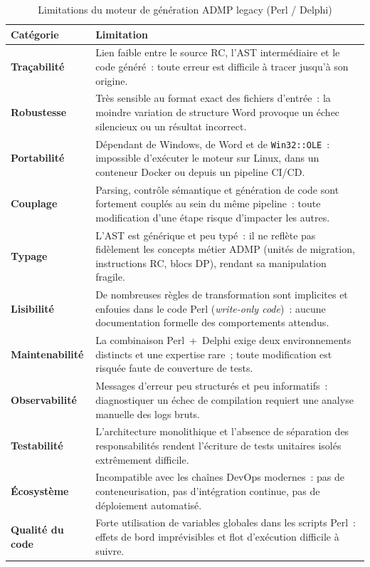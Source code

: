 \begin{table}[H]
\centering
\caption{Limitations du moteur de génération ADMP legacy (Perl / Delphi)}
\label{tab:limits-legacy}
\begin{tabularx}{\textwidth}{lX}
\toprule
\textbf{Catégorie} & \textbf{Limitation} \\
\midrule
\textbf{Traçabilité} &
  Lien faible entre le source RC, l'AST intermédiaire et le code généré~: toute erreur est difficile à tracer jusqu'à son origine. \\
\addlinespace
\textbf{Robustesse} &
  Très sensible au format exact des fichiers d'entrée~: la moindre variation de structure Word provoque un échec silencieux ou un résultat incorrect. \\
\addlinespace
\textbf{Portabilité} &
  Dépendant de Windows, de Word et de \texttt{Win32::OLE}~: impossible d'exécuter le moteur sur Linux, dans un conteneur Docker ou depuis un pipeline CI/CD. \\
\addlinespace
\textbf{Couplage} &
  Parsing, contrôle sémantique et génération de code sont fortement couplés au sein du même pipeline~: toute modification d'une étape risque d'impacter les autres. \\
\addlinespace
\textbf{Typage} &
  L'AST est générique et peu typé~: il ne reflète pas fidèlement les concepts métier ADMP (unités de migration, instructions RC, blocs DP), rendant sa manipulation fragile. \\
\addlinespace
\textbf{Lisibilité} &
  De nombreuses règles de transformation sont implicites et enfouies dans le code Perl (\textit{write-only code})~: aucune documentation formelle des comportements attendus. \\
\addlinespace
\textbf{Maintenabilité} &
  La combinaison Perl~+~Delphi exige deux environnements distincts et une expertise rare~; toute modification est risquée faute de couverture de tests. \\
\addlinespace
\textbf{Observabilité} &
  Messages d'erreur peu structurés et peu informatifs~: diagnostiquer un échec de compilation requiert une analyse manuelle des logs bruts. \\
\addlinespace
\textbf{Testabilité} &
  L'architecture monolithique et l'absence de séparation des responsabilités rendent l'écriture de tests unitaires isolés extrêmement difficile. \\
\addlinespace
\textbf{Écosystème} &
  Incompatible avec les chaînes DevOps modernes~: pas de conteneurisation, pas d'intégration continue, pas de déploiement automatisé. \\
\addlinespace
\textbf{Qualité du code} &
  Forte utilisation de variables globales dans les scripts Perl~: effets de bord imprévisibles et flot d'exécution difficile à suivre. \\
\bottomrule
\end{tabularx}
\end{table}

